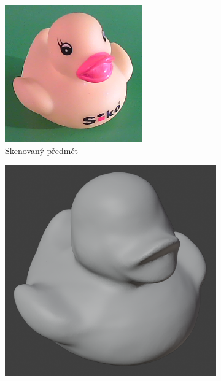 \documentclass[12pt]{report}			%
\begin{document}
    	        \begin{figure}[h]
                    \centering
                    \begin{subfigure}[b]{0.3\textwidth}
                        \centering
                        \includegraphics[width=\textwidth]{images/kachnaOriginal.png}
                        \caption{Skenovaný předmět}
                    \end{subfigure}
                    \hfill
                    \begin{subfigure}[b]{0.3\textwidth}
                        \centering
                        \includegraphics[width=\textwidth]{images/kachnaObrazSedy.png}

\end{subfigure}
\end{figure}
\end{document}
